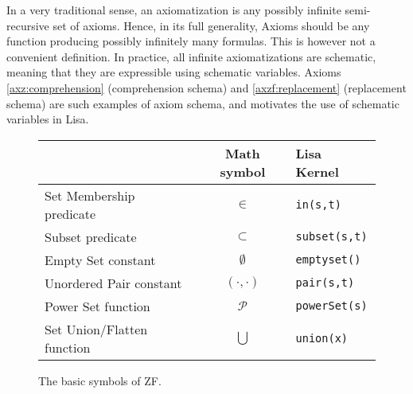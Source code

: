 In a very traditional sense, an axiomatization is any possibly infinite semi-recursive set of axioms. Hence, in its full generality, Axioms should be any function producing possibly infinitely many formulas.
This is however not a convenient definition. In practice, all infinite axiomatizations are schematic, meaning that they are expressible using schematic variables. Axioms \ref{axz:comprehension} (comprehension schema) and \ref{axzf:replacement} (replacement schema) are such examples of axiom schema, and motivates the use of schematic variables in Lisa.



\begin{figure}
  \begin{center}
    \begin{tabular}{l|c|l}
      {}                         & Math symbol       & Lisa Kernel             \\ \hline
      Set Membership predicate   & $\in$             & \lstinline$in(s,t)$     \\
      Subset predicate           & $\subset$         & \lstinline$subset(s,t)$ \\
      Empty Set constant         & $\emptyset$       & \lstinline$emptyset()$  \\
      Unordered Pair constant    & $(\cdot, \cdot )$ & \lstinline$pair(s,t)$   \\
      Power Set function         & $\mathcal P$      & \lstinline$powerSet(s)$ \\
      Set Union/Flatten function & $\bigcup$         & \lstinline$union(x)$    \\
    \end{tabular}

    \caption{The basic symbols of ZF.}
    \label{fig:symbolszf}
  \end{center}
\end{figure}

